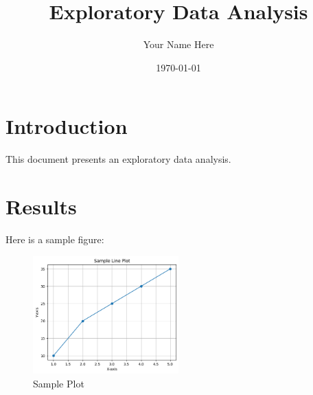 \documentclass{article}
\title{Exploratory Data Analysis}
\author{Your Name Here}
\date{\today}
\begin{document}
\maketitle

\section{Introduction}
This document presents an exploratory data analysis.

\section{Results}
Here is a sample figure:

\begin{figure}[h]
    \centering
    \includegraphics[width=0.5\textwidth]{figures/dummy_plot.png}
    \caption{Sample Plot}
    \label{fig:sample_plot}
\end{figure}
\end{document}
